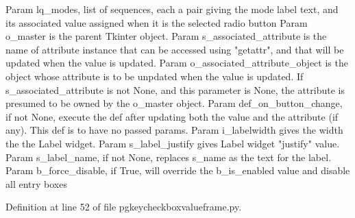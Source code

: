 \begin{DoxyVerb}Param lq_modes, list of sequences, each a pair
    giving the mode label text, and its associated value
    assigned when it is the selected radio button
Param o_master is the parent Tkinter object.
Param s_associated_attribute is the name of 
    attribute instance that can be accessed
    using "getattr", and that will be
    updated when the value is updated.
Param o_associated_attribute_object is the object whose attribute
    is to be unpdated when the value is updated.  If
    s_associated_attribute is not None, and this parameter
    is None, the attribute is presumed to be
    owned by the o_master object.
Param def_on_button_change, if not None, execute the def
    after updating both the value and the attribute (if any).
    This def is to have no passed params.
Param i_labelwidth gives the width the the Label widget.
Param s_label_justify gives Label widget "justify" value.
Param s_label_name, if not None, replaces s_name as the text for the label.
Param b_force_disable, if True, will override the b_is_enabled value and disable all entry 
      boxes
\end{DoxyVerb}
 

Definition at line 52 of file pgkeycheckboxvalueframe.\+py.


